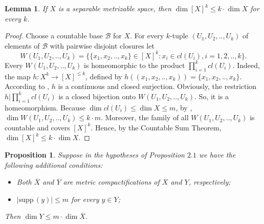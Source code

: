 \documentclass[12pt]{amsart}
\newtheorem{lem}[thm]{Lemma}
\newtheorem{pro}[thm]{Proposition}
\def\supp{{\mathrm {supp}}\,}
\begin{document}
\begin{lem}
If $X$ is a separable metrizable space, then $\dim [X]^k\leq k\cdot\dim X$ for every $k$. 
\end{lem}
\begin{proof}
 Choose a countable base 
$\mathcal B$ for $X$. For every $k$-tuple $(U_1,U_2,..,U_k)$ of elements of $\mathcal B$ with pairwise disjoint closures let $$W(U_1,U_2,..,U_k)=\{\{x_1,x_2,..,x_k\}\in [X]^k:x_i\in cl(U_i), i=1,2,..,k\}.$$ Every $W(U_1,U_2,..,U_k)$ is homeomorphic to the product
$\prod_{i=1}^kcl(U_i)$. Indeed, the map $h:X^k\to [X]^{\leq k}$, defined by $h((x_1,x_2,..,x_k))=\{x_1,x_2,..,x_k\}$. According to \cite{mi}, $h$ is a continuous and closed surjection. Obviously, the restriction $h|\prod_{i=1}^kcl(U_i)$ is a closed bijection onto $W(U_1,U_2,..,U_k)$. So, it is a homeomorphism.
Because $\dim cl(U_i)\leq\dim X\leq m$, by \cite[Theorem 3.4.9]{en}, $\dim W(U_1,U_2,..,U_k)\leq k\cdot m$. Moreover, the family of all $W(U_1,U_2,..,U_k)$ is countable and covers $[X]^k$. Hence, by the Countable Sum Theorem, $\dim [X]^k\leq k\cdot\dim X$. 
 \end{proof}
\begin{pro}
Suppose in the hypotheses of Proposition $2.1$ we have the following additional conditions:
\begin{itemize}
\item Both $\overline X$ and $\overline Y$ are metric compactifications of $X$ and $Y$, respectively;
\item $|\supp(y)|\leq m$ for every $y\in Y$;
\end{itemize}
Then $\dim Y\leq m\cdot\dim\overline X$. %
\end{pro}
\end{document}
